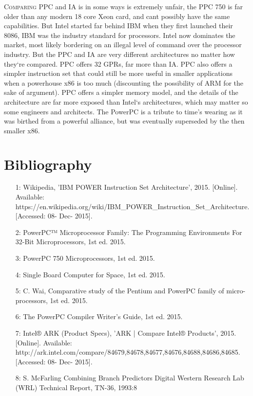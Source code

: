\documentclass[10pt]{article}
\begin{document}
\textsc{Comparing} PPC and IA is in some ways is extremely unfair, the PPC 750 is far older than any modern 18 core Xeon card, and can\’t possibly have the same capabilities. But Intel started far behind IBM when they first launched their 8086, IBM was the industry standard for processors. Intel now dominates the market, most likely bordering on an illegal level of command over the processor industry. But the PPC and IA are very different architectures no matter how they`re compared. PPC offers 32 GPRs, far more than IA. PPC also offers a simpler instruction set that could still be more useful in smaller applications when a powerhouse x86 is too much (discounting the possibility of ARM for the sake of argument). PPC offers a simpler memory model, and the details of the architecture are far more exposed than Intel`s architectures, which may matter so some engineers and architects. The PowerPC is a tribute to time’s wearing as it was birthed from a powerful alliance, but was eventually superseded by the then smaller x86. 
\par 
\pagebreak

\clearpage
\section{Bibliography}
    \begin{itemize}
        \item[1:] Wikipedia, 'IBM POWER Instruction Set Architecture', 2015. [Online]. Available: https://en.wikipedia.org/wiki/IBM\_POWER\_Instruction\_Set\_Architecture. [Accessed: 08- Dec- 2015].
        \item[2:] PowerPC™ Microprocessor Family: The Programming Environments For 32-Bit Microprocessors, 1st ed. 2015.
        \item[3:] PowerPC 750 Microprocessors, 1st ed. 2015.
        \item[4:] Single Board Computer for Space, 1st ed. 2015.
        \item[5:] C. Wai, Comparative study of the Pentium and PowerPC family of micro-processors, 1st ed. 2015.
        \item[6:] The PowerPC Compiler Writer’s Guide, 1st ed. 2015.
        \item[7:] Intel® ARK (Product Specs), 'ARK | Compare Intel® Products', 2015. [Online]. Available: http://ark.intel.com/compare/84679,84678,84677,84676,84688,84686,84685. [Accessed: 08- Dec- 2015]. 
        \item[8:] S. McFarling Combining Branch Predictors Digital Western Research Lab (WRL) Technical Report, TN-36, 1993:8
    \end{itemize}
\end{document}
